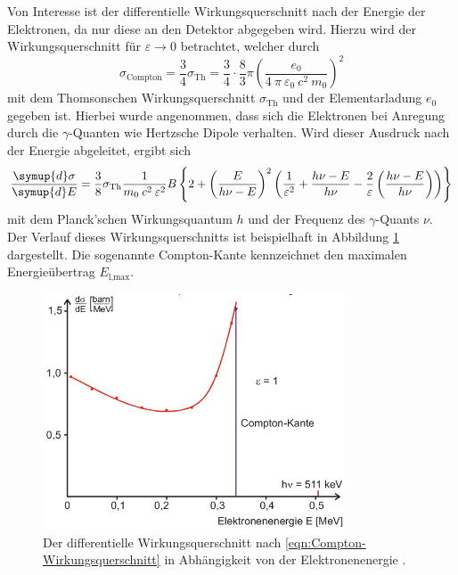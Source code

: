 Von Interesse ist der differentielle Wirkungsquerschnitt nach der Energie der
Elektronen, da nur diese an den Detektor abgegeben wird. Hierzu
wird der Wirkungsquerschnitt für $\varepsilon \rightarrow 0$ betrachtet,
welcher durch
\begin{equation*}
	\sigma_\text{Compton} = \frac{3}{4} \sigma_\text{Th}
	= \frac{3}{4} \cdot \frac{8}{3} \pi
	\left(\frac{e_0}{4\:\pi\:\varepsilon_0\:c^2\:m_0}\right)^2
\end{equation*}
mit dem Thomsonschen Wirkungsquerschnitt $\sigma_\text{Th}$ und der Elementarladung $e_0$ gegeben ist.
Hierbei wurde angenommen, dass sich die Elektronen bei Anregung durch die
$\gamma$-Quanten wie Hertzsche Dipole verhalten.
Wird dieser Ausdruck nach der Energie abgeleitet, ergibt sich
\begin{equation}
	\frac{\symup{d}\sigma}{\symup{d}E} =
	\frac{3}{8} \sigma_\text{Th} \frac{1}{m_0\:c^2\:\varepsilon^2}
  B
	\left\{2 + \left(\frac{E}{h \nu - E}\right)^2
	\left(\frac{1}{\varepsilon^2} + \frac{h \nu - E}{h \nu} - \frac{2}{\varepsilon}
	\left(\frac{h \nu - E}{h \nu}\right)\right)\right\}
	\label{eqn:Compton-Wirkungsquerschnitt}
\end{equation}
mit dem Planck'schen Wirkungsquantum $h$ und der Frequenz des $\gamma$-Quants $\nu$.
Der Verlauf dieses Wirkungsquerschnitts ist beispielhaft in Abbildung \ref{fig:Compton-Wirkungsquerschnitt}
dargestellt. Die sogenannte Compton-Kante kennzeichnet den maximalen Energieübertrag
$E_\text{l,max}$.

\begin{figure}
	\centering
	\includegraphics[height=7.0cm]{images/Compton-Wirkungsquerschnitt.pdf}
	\caption{Der differentielle Wirkungsquerschnitt nach \eqref{eqn:Compton-Wirkungsquerschnitt}
	in Abhängigkeit von der Elektronenenergie \cite[7]{anleitung}.}
	\label{fig:Compton-Wirkungsquerschnitt}
\end{figure}
\FloatBarrier

